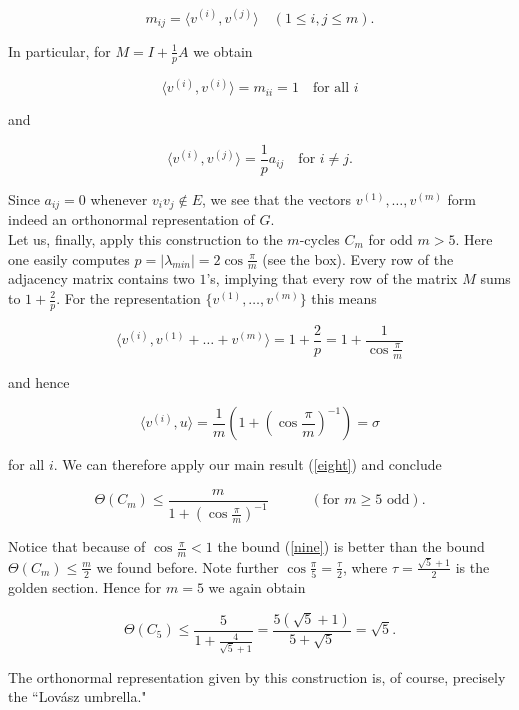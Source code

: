 \[
m_{ij} = \langle v^{(i)}, v^{(j)} \rangle  \quad  (1 \leq i,j \leq m).
\]

In particular, for $M = I + {\frac{1}{p}}A$ we obtain

\[
\langle v^{(i)}, v^{(i)} \rangle = m_{ii} = 1  \quad \text{for all }i
\]

and

\[
\langle v^{(i)}, v^{(j)} \rangle = {\frac{1}{p}}a_{ij} \quad \text{for }i \neq j.
\]

Since $a_{ij} = 0 $ whenever $ v_i v_j \notin E$, we see that the 
vectors $v^{(1)},\ldots,v^{(m)}$ form indeed an orthonormal representation of $G$.\\[5pt]
Let us, finally, apply this construction to the $m$-cycles $C_m$ for odd $m > 5$. 
Here one easily computes $p = |\lambda_{min}| = 2\cos{\frac{\pi}{m}}$ (see the box). Every 
row of the adjacency matrix contains two $1$'s, implying that every row of 
the matrix $M$ sums to $1 + {\frac{2}{p}}$. For the representation $\{ v^{(1)}, \ldots, v^{(m)}\}$ this
means

\[ 
    \langle v^{(i)},v^{(1)}+ \ldots + v^{(m)} \rangle=1+{\frac{2}{p}}=1+{\frac{1}{\cos{\frac{\pi}{m}}}}
\]

and hence 
\vspace{-20pt}

\[
\langle v^{(i)},u \rangle = {\frac{1}{m}}(1+(\cos{\frac{\pi}{m}})^{-1})=\sigma
\]

for all $i$. We can therefore apply our main result (\ref{eight}) and conclude

\begin{equation}
    \Theta(C_m) \leq {\frac{m}{1+(\cos{\frac{\pi}{m}})^{-1}}} \quad\quad\quad (\text{for $m \geq 5$ odd}).\label{nine}    
\end{equation}


\setnewpagemargins

Notice that because of $\cos{\frac{\pi}{m}} < 1$ the bound (\ref{nine}) is better than the bound 
$\Theta(C_m) \leq {\frac{m}{2}}$ we found before. Note further $\cos{\frac{\pi}{5}} = {\frac{\tau}{2}}$, where $\tau = {\frac{\sqrt{5}+1}{2}}$
is the golden section. Hence for $m = 5$ we again obtain

\[
\Theta(C_5) \leq {\frac{5}{1 + {\frac{4}{\sqrt{5}+1}}}}={\frac{5(\sqrt{5}+1)}{5+\sqrt{5}}} = \sqrt{5}.
\]

The orthonormal representation given by this construction is, of course, 
precisely the ``Lov\'asz umbrella."\\

